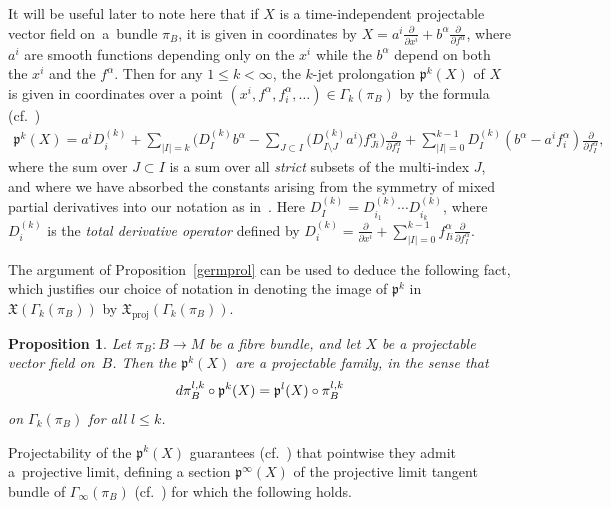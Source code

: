 \documentclass[11pt]{article}
\numberwithin{equation}{section}
\numberwithin{equation}{section}
\newtheorem{Proposition}[Theorem]{Proposition}
\def\proj{\operatorname{proj}}
\def\XF{{\mathfrak{X}}}
\def\pf{{\mathfrak{p}}}
\begin{document}
It will be useful later to note here that if $X$ is a time-independent projectable vector field on~a~bundle $\pi_{B}$, it is given in coordinates by $X = a^{i}\frac{\partial}{\partial x^{i}} + b^{\alpha}\frac{\partial}{\partial f^{\alpha}}$, where $a^{i}$ are smooth functions depending only on the $x^{i}$ while the $b^{\alpha}$ depend on both the $x^{i}$ and the $f^{\alpha}$. Then for any $1\leq k<\infty$, the $k$-jet prolongation $\pf^{k}(X)$ of $X$ is given in coordinates over a point $(x^{i},f^{\alpha},f^{\alpha}_{i},\dots)\in \Gamma_{k}(\pi_{B})$ by the formula (cf.~\cite[Theorem~2.36]{olver})
\begin{gather}\label{prolongation}
\pf^{k}(X) = a^{i}D_{i}^{(k)}+\sum_{|I|=k}\!\bigg(D^{(k)}_{I}b^{\alpha}-\sum_{J\subset I}\big(D^{(k)}_{I\setminus J}a^{i}\big)f^{\alpha}_{Ji}\bigg)\frac{\partial}{\partial f^{\alpha}_{I}}+\!\sum_{|I|=0}^{k-1}D^{(k)}_{I}(b^{\alpha}-a^{i}f^{\alpha}_{i})\frac{\partial}{\partial f^{\alpha}_{I}},
\end{gather}
where the sum over $J\subset I$ is a sum over all \textit{strict} subsets of the multi-index $J$, and where we have absorbed the constants arising from the symmetry of mixed partial derivatives into our notation as in~\cite[equation~(1.15)]{varbi}. Here $D^{(k)}_{I} = D^{(k)}_{i_{1}}\cdots D^{(k)}_{i_{k}}$, where $D^{(k)}_{i}$ is the \textit{total derivative operator} defined by $D^{(k)}_{i} = \frac{\partial}{\partial x^{i}}+\sum_{|I|=0}^{k-1}f^{\alpha}_{Ii}\frac{\partial}{\partial f^{\alpha}_{I}}$.

The argument of Proposition~\ref{germprol} can be used to deduce the following fact, which justifies our choice of notation in denoting the image of $\pf^{k}$ in $\XF(\Gamma_{k}(\pi_{B}))$ by $\XF_{\proj}(\Gamma_{k}(\pi_{B}))$.

\begin{Proposition}
Let $\pi_{B}\colon B\rightarrow M$ be a fibre bundle, and let $X$ be a projectable vector field on~$B$. Then the $\pf^{k}(X)$ are a projectable family, in the sense that
\begin{gather*}
{\rm d}\pi_{B}^{l,k}\circ \pf^{k}(X) = \pf^{l}(X)\circ\pi_{B}^{l,k}
\end{gather*}
on $\Gamma_{k}(\pi_{B})$ for all $l\leq k$.
\end{Proposition}

Projectability of the $\pf^{k}(X)$ guarantees (cf.~\cite[equation~(1.11)]{varbi}) that pointwise they admit a~pro\-jective limit, defining a section $\pf^{\infty}(X)$ of the projective limit tangent bundle of $\Gamma_{\infty}(\pi_{B})$ (cf.~\cite[Chapter One, Section B]{varbi}) for which the following holds.
\end{document}
